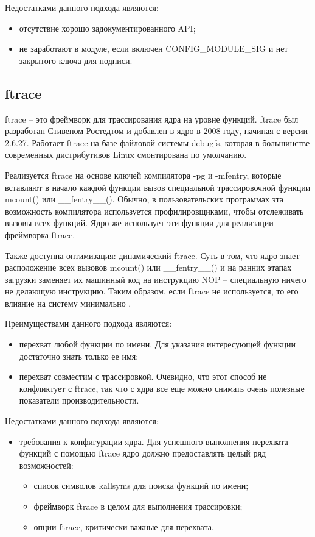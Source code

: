 Недостатками данного подхода являются:

\begin{itemize}
	\item отсутствие хорошо задокументированного API;
	\item не заработают в модуле, если включен CONFIG\_MODULE\_SIG и нет закрытого ключа для подписи.
\end{itemize}

\subsection{ftrace}

ftrace -- это фреймворк для трассирования ядра на уровне функций. ftrace был разработан Стивеном Ростедтом и добавлен в ядро в 2008 году, начиная с версии 2.6.27. Работает ftrace на базе файловой системы debugfs, которая в большинстве современных дистрибутивов Linux смонтирована по умолчанию.

Реализуется ftrace на основе ключей компилятора -pg и -mfentry, которые вставляют в начало каждой функции вызов специальной трассировочной функции mcount() или \_\_fentry\_\_(). Обычно, в пользовательских программах эта возможность компилятора используется профилировщиками, чтобы отслеживать вызовы всех функций. Ядро же использует эти функции для реализации фреймворка ftrace.

Также доступна оптимизация: динамический ftrace. Суть в том, что ядро знает расположение всех вызовов mcount() или \_\_fentry\_\_() и на ранних этапах загрузки заменяет их машинный код на инструкцию NOP -- специальную ничего не делающую инструкцию. Таким образом, если ftrace не используется, то его влияние на систему минимально \cite{tras_ftrace}.

Преимуществами данного подхода являются:

\begin{itemize}
	\item перехват любой функции по имени. Для указания интересующей функции достаточно знать только ее имя;
	\item перехват совместим с трассировкой. Очевидно, что этот способ не конфликтует с ftrace, так что с ядра все еще можно снимать очень полезные показатели производительности. 
\end{itemize}

Недостатками данного подхода являются:

\begin{itemize}
	\item требования к конфигурации ядра. Для успешного выполнения перехвата функций с помощью ftrace ядро должно предоставлять целый ряд возможностей:
		\begin{itemize}
			\item список символов kallsyms для поиска функций по имени;
			\item фреймворк ftrace в целом для выполнения трассировки;
			\item опции ftrace, критически важные для перехвата.
		\end{itemize}
\end{itemize}

